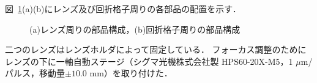 図\ \ref{fig:lens_grating_system}(a)(b)にレンズ及び回折格子周りの各部品の配置を示す．
\begin{figure}
    \caption{(a)レンズ周りの部品構成，(b)回折格子周りの部品構成}
    \label{fig:lens_grating_system}
\end{figure}
二つのレンズはレンズホルダによって固定している．
フォーカス調整のためにレンズの下に一軸自動ステージ（シグマ光機株式会社製 HPS60-20X-M5，1 $\mu\mathrm{m}$/パルス，移動量$\pm{10.0}$ mm）を取り付けた．
